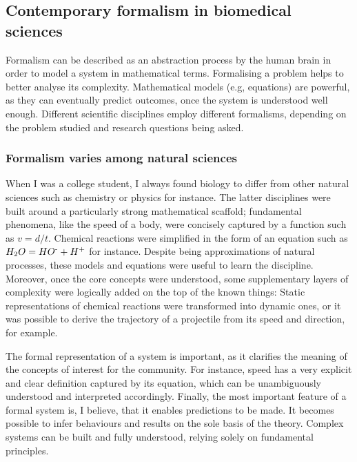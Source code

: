 \subsection{Contemporary formalism in biomedical sciences}

Formalism can be described as an abstraction process by the human brain in order to model a system in mathematical terms. Formalising a problem helps to better analyse its complexity. Mathematical models (e.g, equations) are powerful, as they can eventually predict outcomes, once the system is understood well enough. Different scientific disciplines employ different formalisms, depending on the problem studied and research questions being asked.

\subsubsection{Formalism varies among natural sciences}

When I was a college student, I always found biology to differ from other natural sciences such as chemistry or physics for instance. The latter disciplines were built around a particularly strong mathematical scaffold; fundamental phenomena, like the speed of a body, were concisely captured by a function such as $ v=d/t $. Chemical reactions were simplified in the form of an equation such as $ H_{2}O = HO \textsuperscript{-} + H \textsuperscript{+} $ for instance. Despite being approximations of natural processes, these models and equations were useful to learn the discipline. Moreover, once the core concepts were understood, some supplementary layers of complexity were logically added on the top of the known things: Static representations of chemical reactions were transformed into dynamic ones, or it was possible to derive the trajectory of a projectile from its speed and direction, for example.

The formal representation of a system is important, as it clarifies the meaning of the concepts of interest for the community. For instance, speed has a very explicit and clear definition captured by its equation, which can be unambiguously understood and interpreted accordingly. Finally, the most important feature of a formal system is, I believe, that it enables predictions to be made. It becomes possible to infer behaviours and results on the sole basis of the theory. Complex systems can be built and fully understood, relying solely on fundamental principles.

